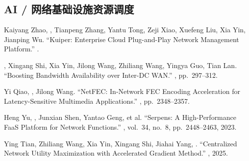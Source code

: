 \documentclass[11pt]{article}
\begin{document}
\subsection*{AI / 网络基础设施资源调度}
\begin{publist}[resume]

\item Kaiyang Zhao, \corr, Tianpeng Zhang, Yantu Tong, Zeji Xiao,
Xuefeng Liu, Xia Yin, Jianping Wu. ``Kuiper: Enterprise Cloud Plug-and-Play Network
Management Platform.'' .

\item {}, Xingang Shi\corr, Xia Yin, Jilong Wang, Zhiliang Wang, Yingya
Guo, Tian Lan. ``Boosting Bandwidth Availability over Inter-DC WAN.''
, pp.~297--312.

\item Yi Qiao, \corr, Jilong Wang. ``NetFEC: In-Network FEC Encoding
Acceleration for Latency-Sensitive Multimedia Applications.''
, pp.~2348--2357.

\item Heng Yu, \corr, Junxian Shen, Yantao Geng, et al. ``Serpens: A
High-Performance FaaS Platform for Network Functions.'' , vol.~34, no.~8, pp.~2448--2463, 2023.

\item Ying Tian, Zhiliang Wang\corr, Xia Yin, Xingang Shi, Jiahai Yang, \corr. ``Centralized Network Utility Maximization with Accelerated Gradient
Method.'' , 2025.

\end{publist}
\end{document}
